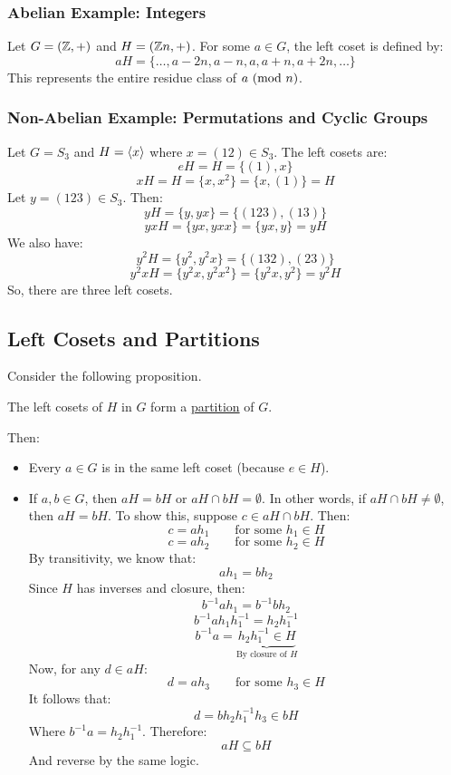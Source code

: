 \documentclass[letterpaper]{article}
\begin{document}
\subsubsection{Abelian Example: Integers}
Let $G = (\mathbb{Z}, +)$ and $H = (\mathbb{Z} n, +)$. For some $a \in G$, the left coset is defined by: 
\[aH = \{\dots, a - 2n, a - n, a, a + n, a + 2n, \dots\}\]
This represents the entire residue class of $a \ (\mathrm{mod}\ n)$. 

\subsubsection{Non-Abelian Example: Permutations and Cyclic Groups}
Let $G = S_3$ and $H = \langle x \rangle$ where $x = (12) \in S_3$. The left cosets are: 
\[eH = H = \{(1), x\}\]
\[xH = H = \{x, x^2\} = \{x, (1)\} = H\]
Let $y = (123) \in S_3$. Then: 
\[yH = \{y, yx\} = \{(123), (13)\}\]
\[yxH = \{yx, yxx\} = \{yx, y\} = yH\]
We also have: 
\[y^2 H = \{y^2, y^2 x\} = \{(132), (23)\}\]
\[y^2 x H = \{y^2 x, y^2 x^2\} = \{y^2 x, y^2\} = y^2 H\]
So, there are three left cosets. 

\subsection{Left Cosets and Partitions}
Consider the following proposition. 
\begin{proposition}
    The left cosets of $H$ in $G$ form a \underline{partition} of $G$. 
\end{proposition}
Then: 
\begin{itemize}
    \item Every $a \in G$ is in the same left coset (because $e \in H$). 
    \item If $a, b \in G$, then $aH = bH$ or $aH \cap bH = \emptyset$. In other words, if $aH \cap bH \neq \emptyset$, then $aH = bH$. To show this, suppose $c \in aH \cap bH$. Then: 
    \[c = ah_1 \qquad \text{for some } h_1 \in H\]
    \[c = ah_2 \qquad \text{for some } h_2 \in H\]
    By transitivity, we know that: 
    \[ah_1 = bh_2\]
    Since $H$ has inverses and closure, then:
    \[b^{-1} ah_1 = b^{-1} b h_2\]
    \[b^{-1} ah_1 h_{1}^{-1} = h_2 h_{1}^{-1}\] 
    \[b^{-1} a = \underbrace{h_{2} h_{1}^{-1} \in H}_{\text{By closure of } H}\]
    Now, for any $d \in aH$: 
    \[d = ah_3 \qquad \text{for some } h_3 \in H\]
    It follows that:
    \[d = bh_2 h_{1}^{-1} h_3 \in bH\]
    Where $b^{-1} a = h_{2} h_{1}^{-1}$. Therefore: 
    \[aH \subseteq bH\]
    And reverse by the same logic. 
\end{itemize}
\end{document}
